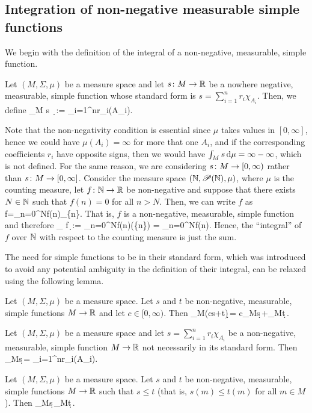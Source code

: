 \subsection{Integration of non-negative measurable simple functions}

We begin with the definition of the integral of a non-negative, measurable, simple function.

\bd
Let $(M,\Sigma,\mu)$ be a measure space and let $s\colon M \to \mathbb{R}$ be a nowhere negative, measurable, simple function whose standard form is $s=\sum_{i=1}^n r_i \chi_{A_i}$. Then, we define
\bse
\int_M \! s \, \d \mu := \sum_{i=1}^nr_i\mu(A_i).
\ese
\ed

Note that the non-negativity condition is essential since $\mu$ takes values in $[0,\infty]$, hence we could have $\mu(A_i)=\infty$ for more that one $A_i$, and if the corresponding coefficients $r_i$ have opposite signs, then we would have $\int_Ms\,\mathrm{d}\mu=\infty-\infty$, which is not defined. For the same reason, we are considering $s\colon M\to [0,\infty)$ rather than $s\colon M\to [0,\infty]$.
\be
Consider the measure space $(\mathbb{N},\mathscr{P}(\mathbb{N}),\mu)$, where $\mu$ is the counting measure, let $f\colon \mathbb{N} \to \mathbb{R}$ be non-negative and suppose that there exists $N\in\mathbb{N}$ such that $f(n)=0$ for all $n>N$. Then, we can write $f$ as
\bse
f=\sum_{n=0}^Nf(n)\chi_{\{n\}}.
\ese
That is, $f$ is a non-negative, measurable, simple function and therefore
\bse
\int_{\N}\! f \,\d \mu := \sum_{n=0}^Nf(n)\mu(\{n\}) = \sum_{n=0}^Nf(n).
\ese
Hence, the ``integral'' of $f$ over $\mathbb{N}$ with respect to the counting measure is just the sum.
\ee

The need for simple functions to be in their standard form, which was introduced to avoid any potential ambiguity in the definition of their integral, can be relaxed using the following lemma.

\bl
\label{lem:simplelinear}
Let $(M,\Sigma,\mu)$ be a measure space. Let $s$ and $t$ be non-negative, measurable, simple functions $M\to \mathbb{R}$ and let $c\in [0,\infty)$. Then
\bse
\int_M\!(cs+t)\,\d\mu = c\int_M\!s\,\d\mu+\int_M\!t\,\d\mu.
\ese
\el

\bp
Let $(M,\Sigma,\mu)$ be a measure space and let $s=\sum_{i=1}^n r_i \chi_{A_i}$ be a non-negative, measurable, simple function $M\to \mathbb{R}$ not necessarily in its standard form. Then
\bse
\int_M\!s\,\d\mu = \sum_{i=1}^nr_i\mu(A_i).
\ese
\ep

\bc
Let $(M,\Sigma,\mu)$ be a measure space. Let $s$ and $t$ be non-negative, measurable, simple functions $M\to \mathbb{R}$ such that $s\leq t$ (that is, $s(m)\leq t(m)$ for all $m\in M$). Then
\bse
\int_M\!s\,\d\mu \leq \int_M\!t\,\d\mu. 
\ese
\ec

